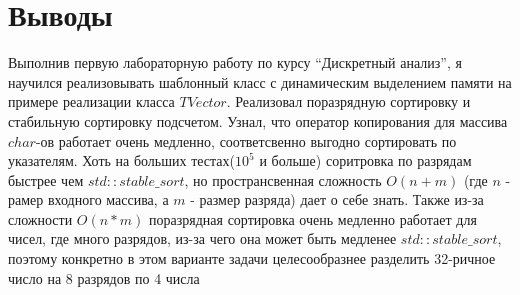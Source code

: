 \section{Выводы}

Выполнив первую лабораторную работу по курсу \enquote{Дискретный анализ}, я научился реализовывать шаблонный класс с динамическим выделением памяти на примере реализации класса $TVector$. Реализовал поразрядную сортировку и стабильную сортировку подсчетом. Узнал, что оператор копирования для массива $char$-ов работает очень медленно, соответсвенно выгодно сортировать по указателям. Хоть на больших тестах($10^5$ и больше) соритровка по разрядам быстрее чем $std::stable\_sort$, но пространсвенная сложность $O(n + m)$ (где $n$ - рамер входного массива, а $m$ - размер разряда) дает о себе знать. Также из-за сложности $O(n*m)$ поразрядная сортировка очень медленно работает для чисел, где много разрядов, из-за чего она может быть медленее $std::stable\_sort$, поэтому конкретно в этом варианте задачи целесообразнее разделить 32-ричное число на 8 разрядов по 4 числа
\pagebreak
